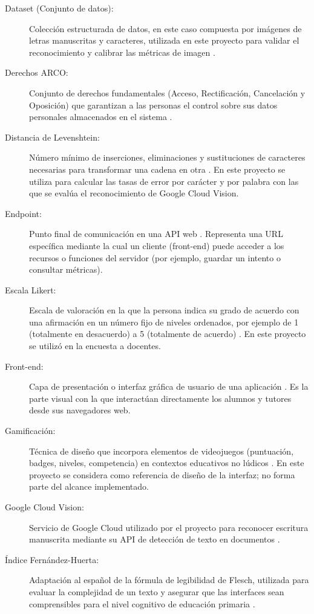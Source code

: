 \documentclass[12pt]{article}
\begin{document}
\begin{description}
    \item[Dataset (Conjunto de datos):] Colección estructurada de datos, en este caso compuesta por imágenes de letras manuscritas y caracteres, utilizada en este proyecto para validar el reconocimiento y calibrar las métricas de imagen \cite{goodfellow2016deep}.
    \item[Derechos ARCO:] Conjunto de derechos fundamentales (Acceso, Rectificación, Cancelación y Oposición) que garantizan a las personas el control sobre sus datos personales almacenados en el sistema \cite{lfpdppp2025}.
    \item[Distancia de Levenshtein:] Número mínimo de inserciones, eliminaciones y sustituciones de caracteres necesarias para transformar una cadena en otra \cite{levenshtein1966binary}. En este proyecto se utiliza para calcular las tasas de error por carácter y por palabra con las que se evalúa el reconocimiento de Google Cloud Vision.
    \item[Endpoint:] Punto final de comunicación en una API web \cite{fielding2000rest, rfc9110}. Representa una URL específica mediante la cual un cliente (front-end) puede acceder a los recursos o funciones del servidor (por ejemplo, guardar un intento o consultar métricas).
    \item[Escala Likert:] Escala de valoración en la que la persona indica su grado de acuerdo con una afirmación en un número fijo de niveles ordenados, por ejemplo de 1 (totalmente en desacuerdo) a 5 (totalmente de acuerdo) \cite{likert1932technique}. En este proyecto se utilizó en la encuesta a docentes.
    \item[Front-end:] Capa de presentación o interfaz gráfica de usuario de una aplicación \cite{fielding2000rest}. Es la parte visual con la que interactúan directamente los alumnos y tutores desde sus navegadores web.
    \item[Gamificación:] Técnica de diseño que incorpora elementos de videojuegos (puntuación, badges, niveles, competencia) en contextos educativos no lúdicos \cite{deterding2011gamification}. En este proyecto se considera como referencia de diseño de la interfaz; no forma parte del alcance implementado.
    \item[Google Cloud Vision:] Servicio de Google Cloud utilizado por el proyecto para reconocer escritura manuscrita mediante su API de detección de texto en documentos \cite{googlevisionHandwriting}.
    \item[Índice Fernández-Huerta:] Adaptación al español de la fórmula de legibilidad de Flesch, utilizada para evaluar la complejidad de un texto y asegurar que las interfaces sean comprensibles para el nivel cognitivo de educación primaria \cite{fernandez1959lecturabilidad}.

\end{description}
\end{document}
